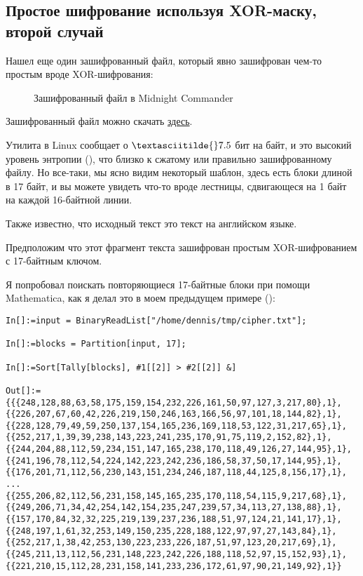 \subsection{Простое шифрование используя XOR-маску, второй случай}
\label{XOR_mask_2}

Нашел еще один зашифрованный файл, который явно зашифрован чем-то простым вроде XOR-шифрования:

\begin{figure}[H]
\centering
{}
\caption{Зашифрованный файл в Midnight Commander}
\end{figure}

Зашифрованный файл можно скачать \href{https://github.com/DennisYurichev/RE-for-beginners/blob/master/ff/XOR/mask_2/files/cipher.txt}{здесь}.

Утилита  в Linux сообщает о $\textasciitilde{}7.5$ бит на байт, и это высокий уровень энтропии (),
что близко к сжатому или правильно зашифрованному файлу.
Но все-таки, мы ясно видим некоторый шаблон, здесь есть блоки длиной в 17 байт, и вы можете увидеть что-то вроде лестницы,
сдвигающеся на 1 байт на каждой 16-байтной линии.

Также известно, что исходный текст это текст на английском языке.

Предположим что этот фрагмент текста зашифрован простым XOR-шифрованием с 17-байтным ключом.

Я попробовал поискать повторяющиеся 17-байтные блоки при помощи Mathematica, как я делал это в моем предыдущем примере
():

\begin{lstlisting}[caption=Mathematica,style=custommath]
In[]:=input = BinaryReadList["/home/dennis/tmp/cipher.txt"];

In[]:=blocks = Partition[input, 17];

In[]:=Sort[Tally[blocks], #1[[2]] > #2[[2]] &]

Out[]:={{{248,128,88,63,58,175,159,154,232,226,161,50,97,127,3,217,80},1},
{{226,207,67,60,42,226,219,150,246,163,166,56,97,101,18,144,82},1},
{{228,128,79,49,59,250,137,154,165,236,169,118,53,122,31,217,65},1},
{{252,217,1,39,39,238,143,223,241,235,170,91,75,119,2,152,82},1},
{{244,204,88,112,59,234,151,147,165,238,170,118,49,126,27,144,95},1},
{{241,196,78,112,54,224,142,223,242,236,186,58,37,50,17,144,95},1},
{{176,201,71,112,56,230,143,151,234,246,187,118,44,125,8,156,17},1},
...
{{255,206,82,112,56,231,158,145,165,235,170,118,54,115,9,217,68},1},
{{249,206,71,34,42,254,142,154,235,247,239,57,34,113,27,138,88},1},
{{157,170,84,32,32,225,219,139,237,236,188,51,97,124,21,141,17},1},
{{248,197,1,61,32,253,149,150,235,228,188,122,97,97,27,143,84},1},
{{252,217,1,38,42,253,130,223,233,226,187,51,97,123,20,217,69},1},
{{245,211,13,112,56,231,148,223,242,226,188,118,52,97,15,152,93},1},
{{221,210,15,112,28,231,158,141,233,236,172,61,97,90,21,149,92},1}}
\end{lstlisting}

